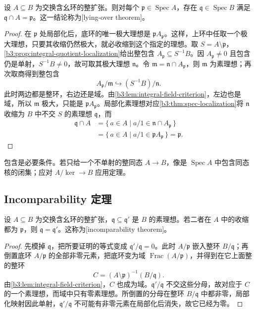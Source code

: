 \begin{theorem}\label{b3:thm:lying-over}
	设 \(A\subseteq B\) 为交换含幺环的整扩张。则对每个 \(\mathfrak p\in\operatorname{Spec}A\)，存在 \(\mathfrak q\in\operatorname{Spec}B\) 满足 \(\mathfrak q\cap A=\mathfrak p\)。这一结论称为[lying-over theorem]。
\end{theorem}
\begin{proof}
	在 \(\mathfrak p\) 处局部化后，底环的唯一极大理想是 \(\mathfrak pA_{\mathfrak p}\)。这样，上环中任取一个极大理想，只要其收缩仍然极大，就必收缩到这个指定的理想。取 \(S=A\setminus\mathfrak p\)，\cref{b3:prop:integral-quotient-localization}给出整包含 \(A_{\mathfrak p}\subseteq S^{-1}B\)。因 \(A_{\mathfrak p}\ne0\) 且包含仍是单射，\(S^{-1}B\ne0\)，故可取其极大理想 \(\mathfrak n\)。令 \(\mathfrak m=\mathfrak n\cap A_{\mathfrak p}\)，则 \(\mathfrak m\) 为素理想；再次取商得到整包含
	\[
		A_{\mathfrak p}/\mathfrak m\hookrightarrow (S^{-1}B)/\mathfrak n.
	\]
	此时两边都是整环，右边还是域。由\cref{b3:lem:integral-field-criterion}，左边也是域，所以 \(\mathfrak m\) 极大，只能是 \(\mathfrak pA_{\mathfrak p}\)。局部化素理想对应\cref{b3:thm:spec-localization}将 \(\mathfrak n\) 收缩为 \(B\) 中不交 \(S\) 的素理想 \(\mathfrak q\)，而
	\[
		\begin{aligned}
			\mathfrak q\cap A &=\{\,a\in A\mid a/1\in\mathfrak n\cap A_{\mathfrak p}\,\}\\
			&=\{\,a\in A\mid a/1\in\mathfrak pA_{\mathfrak p}\,\} =\mathfrak p.
		\end{aligned}
	\]
\end{proof}

包含是必要条件。若只给一个不单射的整同态 \(A\to B\)，像是 \(\operatorname{Spec}A\) 中包含同态核的闭集；应对 \(A/\ker\to B\) 应用定理。

\subsection{Incomparability 定理}\label{b3:subsec:0502:02}

\begin{theorem}[Incomparability]\label{b3:thm:incomparability}
	设 \(A\subseteq B\) 为交换含幺环的整扩张，\(\mathfrak q\subseteq\mathfrak q'\) 是 \(B\) 的素理想。若二者在 \(A\) 中的收缩都为 \(\mathfrak p\)，则 \(\mathfrak q=\mathfrak q'\)。这称为[incomparability theorem]。
\end{theorem}
\begin{proof}
	先模掉 \(\mathfrak q\)，把所要证明的等式变成 \(\mathfrak q'/\mathfrak q=0\)。此时 \(A/\mathfrak p\) 嵌入整环 \(B/\mathfrak q\)；再倒置底环 \(A/\mathfrak p\) 的全部非零元素，把底环变为域 \(\operatorname{Frac}(A/\mathfrak p)\)，并得到在它上面整的整环
	\[
		C=(A\setminus\mathfrak p)^{-1}(B/\mathfrak q).
	\]
	由\cref{b3:lem:integral-field-criterion}，\(C\) 也成为域。\(\mathfrak q'/\mathfrak q\) 不交这些分母，故对应于 \(C\) 的一个素理想，而域中只有零素理想。所倒置的分母在整环 \(B/\mathfrak q\) 中都非零，局部化映射因此单射，\(\mathfrak q'/\mathfrak q\) 不可能有非零元素在局部化后消失，故它已经为零。
\end{proof}

